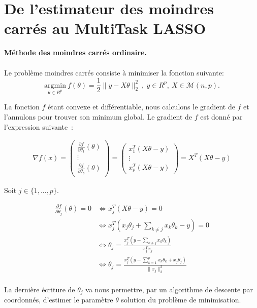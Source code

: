 \documentclass{article}
\begin{document}
\section*{De l'estimateur des moindres carrés au MultiTask LASSO} \vspace{.5cm}

\textbf{Méthode des moindres carrés ordinaire.} \\
\\ Le problème moindres carrés consiste à minimiser la fonction suivante: \\
$$\underset{\theta\in R^p}{\mathrm{argmin}} \ f(\theta)=\frac{1}{2} {\| y - X\theta\|_2^2} \
, \ y \in R^p,\ X \in \mathcal{M}(n,p).
 $$
 
La fonction $f$ étant convexe et différentiable, nous calculons le gradient de $f$ et l'annulons pour trouver son minimum global.
Le gradient de $f$ est donné par l'expression suivante\ :

\begin{align*}
    \nabla f(x) = \begin{pmatrix}
        \frac{\partial f}{\partial \theta_1} (\theta) \\ \vdots \\ \frac{\partial f}{\partial \theta_p} (\theta)
    \end{pmatrix}= \begin{pmatrix}
        x_1^T(X \theta -y) \\ \vdots \\ x_p^T(X \theta -y)
    \end{pmatrix} =X^T(X \theta -y)
\end{align*}

Soit $j \in \{1, ... ,p \}.$
	 
\begin{align*}
    \frac{\partial f}{\partial \theta_j} (\theta) = 0     &\Longleftrightarrow x_j^T(X \theta -y)= 0\\
     &\Longleftrightarrow x_j^T(x_j\theta_j + \sum_{k \ne j} x_k\theta_k - y) = 0\\ &\Longleftrightarrow \theta_j = \frac{x_j^T(y -  \sum_{k \ne j} x_k\theta_k)}{x_j^Tx_j} \\ &\Longleftrightarrow \theta_j = \frac{x_j^T(y -  \sum_{k=1}^{p} x_k\theta_k  + x_j\theta_j)}{\| x_j\|_2^2}
\end{align*} \\

La dernière écriture de $\theta_j$ va nous permettre, par un algorithme de descente par coordonnés, d'estimer le paramètre $\theta$ solution du problème de minimisation.
\end{document}
